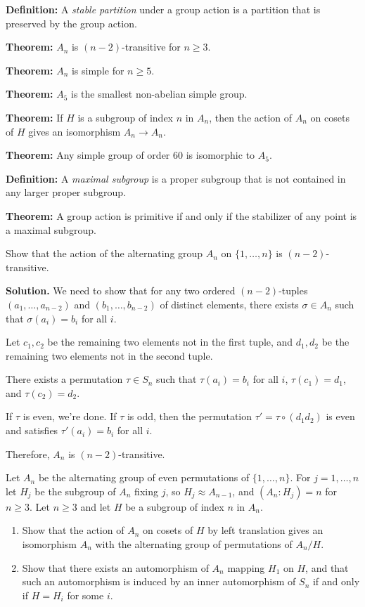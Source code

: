 \textbf{Definition:} A \textit{stable partition} under a group action is a partition that is preserved by the group action.

\textbf{Theorem:} $A_n$ is $(n-2)$-transitive for $n \geq 3$.

\textbf{Theorem:} $A_n$ is simple for $n \geq 5$.

\textbf{Theorem:} $A_5$ is the smallest non-abelian simple group.

\textbf{Theorem:} If $H$ is a subgroup of index $n$ in $A_n$, then the action of $A_n$ on cosets of $H$ gives an isomorphism $A_n \to A_n$.

\textbf{Theorem:} Any simple group of order 60 is isomorphic to $A_5$.

\textbf{Definition:} A \textit{maximal subgroup} is a proper subgroup that is not contained in any larger proper subgroup.

\textbf{Theorem:} A group action is primitive if and only if the stabilizer of any point is a maximal subgroup.

\begin{problembox}
Show that the action of the alternating group $A_n$ on $\{1, \ldots, n\}$ is $(n - 2)$-transitive.
\end{problembox}

\noindent\textbf{Solution.} We need to show that for any two ordered $(n-2)$-tuples $(a_1, \ldots, a_{n-2})$ and $(b_1, \ldots, b_{n-2})$ of distinct elements, there exists $\sigma \in A_n$ such that $\sigma(a_i) = b_i$ for all $i$.

Let $c_1, c_2$ be the remaining two elements not in the first tuple, and $d_1, d_2$ be the remaining two elements not in the second tuple.

There exists a permutation $\tau \in S_n$ such that $\tau(a_i) = b_i$ for all $i$, $\tau(c_1) = d_1$, and $\tau(c_2) = d_2$.

If $\tau$ is even, we're done. If $\tau$ is odd, then the permutation $\tau' = \tau \circ (d_1 d_2)$ is even and satisfies $\tau'(a_i) = b_i$ for all $i$.

Therefore, $A_n$ is $(n-2)$-transitive.

\begin{problembox}
Let $A_n$ be the alternating group of even permutations of $\{1, \ldots, n\}$. For $j = 1, \ldots, n$ let $H_j$ be the subgroup of $A_n$ fixing $j$, so $H_j \approx A_{n-1}$, and $(A_n : H_j) = n$ for $n \geq 3$. Let $n \geq 3$ and let $H$ be a subgroup of index $n$ in $A_n$.
\begin{enumerate}[label=(\alph*)]
\item Show that the action of $A_n$ on cosets of $H$ by left translation gives an isomorphism $A_n$ with the alternating group of permutations of $A_n/H$.
\item Show that there exists an automorphism of $A_n$ mapping $H_1$ on $H$, and that such an automorphism is induced by an inner automorphism of $S_n$ if and only if $H = H_i$ for some $i$.
\end{enumerate}
\end{problembox}

